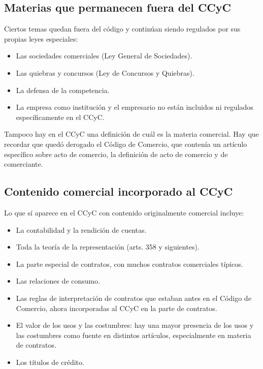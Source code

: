\documentclass[12pt,oneside]{book}
\begin{document}
\subsection{Materias que permanecen fuera del CCyC}

Ciertos temas quedan fuera del código y continúan siendo regulados por sus propias leyes especiales:

\begin{itemize}
    \item Las sociedades comerciales (Ley General de Sociedades).
    \item Las quiebras y concursos (Ley de Concursos y Quiebras).
    \item La defensa de la competencia.
    \item La empresa como institución y el empresario no están incluidos ni regulados específicamente en el CCyC.
\end{itemize}

Tampoco hay en el CCyC una definición de cuál es la materia comercial. Hay que recordar que quedó derogado el Código de Comercio, que contenía un artículo específico sobre acto de comercio, la definición de acto de comercio y de comerciante.

\subsection{Contenido comercial incorporado al CCyC}

Lo que sí aparece en el CCyC con contenido originalmente comercial incluye:

\begin{itemize}
    \item La contabilidad y la rendición de cuentas.
    \item Toda la teoría de la representación (arts. 358 y siguientes).
    \item La parte especial de contratos, con muchos contratos comerciales típicos.
    \item Las relaciones de consumo.
    \item Las reglas de interpretación de contratos que estaban antes en el Código de Comercio, ahora incorporadas al CCyC en la parte de contratos.
    \item El valor de los usos y las costumbres: hay una mayor presencia de los usos y las costumbres como fuente en distintos artículos, especialmente en materia de contratos.
    \item Los títulos de crédito.
\end{itemize}
\end{document}
